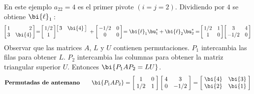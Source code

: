 \begin{enumerate}
\hspace{6pt}
En este ejemplo $a_{22}=4$ es el primer pivote $(i=j=2)$. Dividiendo por $4$ se obtiene $\bi{\ell}_1$\,:%
\vspace{-4pt}
$$
\!\left[\begin{array}{@{\,}rr@{\,}}1&2\\3&\bi{4}\\\end{array}\right]\!=\!\left[\begin{array}{@{\,}c@{\,}}1/2\\1\end{array}\right]\begin{array}{@{\!}c}\left[\begin{array}{@{\,}rr@{\,}}3&\bi{4}\\\end{array}\right]\\\\\end{array}\!+\left[\begin{array}{@{\,}cc@{\,}}-1/2&0\\0&0\\\end{array}\right]\!=\bi{\ell}_1\bu_1^*+\bi{\ell}_2\bu_2^*=\!\left[\begin{array}{@{\,}cc@{\,}}1/2&1\\1&0\\\end{array}\right]\!\left[\begin{array}{@{\,}cc@{\,}}3&4\\-1/2&0\\\end{array}\right]
$$
Observar que las matrices $A$, $L$ y $U$ contienen permutaciones. $P_1$ intercambia las filas para obtener $L$. %
$P_2$ intercambia las columnas para obtener la matriz triangular superior $U$. Entonces $\bi{P_1AP_2=LU}$. %
\vspace{-7pt} %
$$\textbf{Permutadas de antemano}\qquad \bi{P_1AP_2}=\left[\begin{array}{@{\;}cc@{\;}}1&0\\1/2&1\\\end{array}\right]\left[\begin{array}{@{\;}cc@{\;}}4&3\\0&-1/2\\\end{array}\right]=\left[\begin{array}{@{\;}cc@{\;}}\bi{4}&\bi{3}\\\bi{2}&\bi{1}\\\end{array}\right]$$

\end{enumerate}
